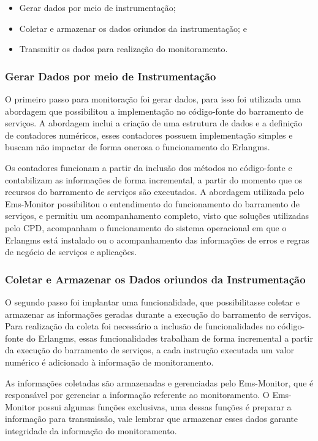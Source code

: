 \begin{itemize}
    \item Gerar dados por meio de instrumentação;
    \item Coletar e armazenar os dados oriundos da instrumentação; e
    \item Transmitir os dados para realização do monitoramento. 
\end{itemize}

\subsubsection{Gerar Dados por meio de Instrumentação}
O primeiro passo para monitoração foi gerar dados, para isso foi utilizada uma abordagem que possibilitou a implementação no código-fonte do barramento de serviços. A abordagem inclui a criação de uma estrutura de dados e a definição de contadores numéricos, esses contadores possuem implementação simples e buscam não impactar de forma onerosa o funcionamento do Erlangms.

Os contadores funcionam a partir da inclusão dos métodos no código-fonte e contabilizam as informações de forma incremental, a partir do momento que os recursos do barramento de serviços são executados. A abordagem utilizada pelo Ems-Monitor possibilitou o entendimento do funcionamento do barramento de serviços, e permitiu um acompanhamento completo, visto que soluções utilizadas pelo \acrshort{CPD}, acompanham o funcionamento do sistema operacional em que o Erlangms está instalado ou o acompanhamento das informações de erros e regras de negócio de serviços e aplicações.      

\subsubsection{Coletar e Armazenar os Dados oriundos da Instrumentação}
O segundo passo foi implantar uma funcionalidade, que possibilitasse coletar e armazenar as informações geradas durante a execução do barramento de serviços. Para realização da coleta foi necessário a inclusão de funcionalidades no código-fonte do Erlangms, essas funcionalidades trabalham de forma incremental a partir da execução do barramento de serviços, a cada instrução executada um valor numérico é adicionado à informação de monitoramento. 

As informações coletadas são armazenadas e gerenciadas pelo Ems-Monitor, que é responsável por gerenciar a informação referente ao monitoramento. O Ems-Monitor possui algumas funções exclusivas, uma dessas funções é preparar a informação para transmissão, vale lembrar que armazenar esses dados garante integridade da informação do monitoramento.

